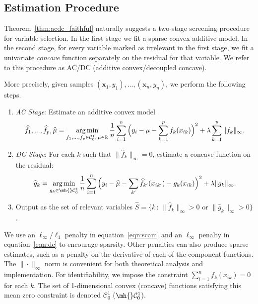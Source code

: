 \def\C{\mathcal{C}}

\subsection{Estimation Procedure}
\label{sec:acdc}

Theorem~\ref{thm:acdc_faithful} naturally suggests a two-stage screening procedure for
variable selection.  In the first stage we fit a sparse convex additive model.
In the second stage, for every variable marked as irrelevant in the first stage,
we fit a univariate \emph{concave} function separately on the residual for
that variable. We refer to this procedure as AC/DC (additive
convex/decoupled concave).

More precisely, given samples  
$(\mathbf{x}_1, y_1), ..., (\mathbf{x}_n, y_n)$, 
we perform the following steps.
\begin{enumerate}
\item {\it AC Stage}: Estimate an additive convex model
\begin{equation}
\label{eqn:scam}
\hat{f}_1, ..., \hat{f}_p, \hat \mu  = \argmin_{f_1,...,f_p \in
  \C^1_0, \,\mu\in\reals} 
   \frac{1}{n} \sum_{i=1}^n \Big(y_i - \mu - \sum_{k=1}^p f_k(x_{ik}) \Big)^2 
       + \lambda \sum_{k=1}^p \| f_k \|_\infty.
\end{equation}
\item {\it DC Stage}: For each $k$ such that $\| \hat{f}_k \|_\infty = 0$, estimate
  a concave function on the residual:
\begin{equation}
\label{eqn:dc}
\hat{g}_k = \argmin_{g_k \in \mh{}\C^1_0} 
   \frac{1}{n} \sum_{i=1}^n \Big( y_i - \hat \mu - \sum_{k'} \hat{f}_{k'}(x_{ik'}) 
    - g_k(x_{ik})\Big)^2 
      + \lambda \| g_k \|_\infty.
\end{equation}
\item Output as the set of relevant variables
$\hat S = \{ k \,:\, \| \hat{f}_k \|_\infty > 0 
  \textrm{ or } \| \hat{g}_k \|_\infty > 0 \}$. 
\end{enumerate}

We use an $\ell_\infty/\ell_1$ penalty in equation~\eqref{eqn:scam}
and an $\ell_\infty$ penalty in equation~\eqref{eqn:dc} to encourage
sparsity.  Other penalties can also produce
sparse estimates, such as a penalty on the derivative of each of the
component functions.  The $\|\cdot\|_\infty$ norm is convenient for both
theoretical analysis and implementation.
For identifiability, we impose the constraint $\sum_{i=1}^n f_k(x_{ik}) =
0$ for each $k$.  The set of 1-dimensional convex (concave) functions
satisfying this mean zero constraint is denoted $\C^1_0$ ($\mh{}\C^1_0$).

